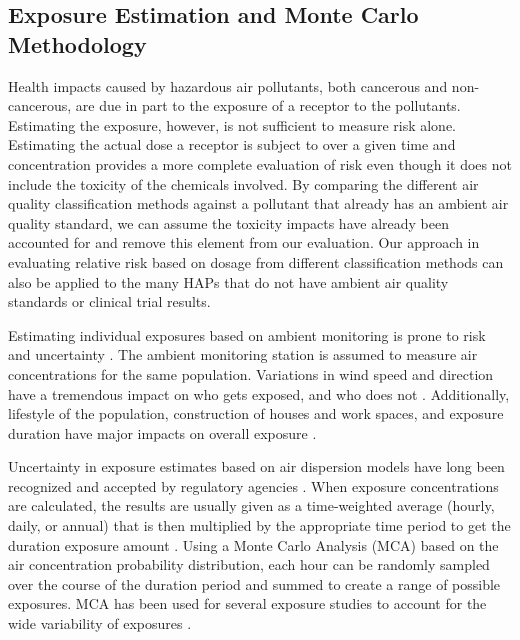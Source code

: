 \subsection{Exposure Estimation and Monte Carlo Methodology}

Health impacts caused by hazardous air pollutants, both cancerous and non-cancerous, are due in part to the exposure of a receptor to the pollutants. Estimating the exposure, however, is not sufficient to measure risk alone. Estimating the actual dose a receptor is subject to over a given time and concentration provides a more complete evaluation of risk even though it does not include the toxicity of the chemicals involved. By comparing the different air quality classification methods against a pollutant that already has an ambient air quality standard, we can assume the toxicity impacts have already been accounted for and remove this element from our evaluation. Our approach in evaluating relative risk based on dosage from different classification methods can also be applied to the many HAPs that do not have ambient air quality standards or clinical trial results.

Estimating individual exposures based on ambient monitoring is prone to risk and uncertainty \citep{Pernigotti2013, Thunis2013}.  The ambient monitoring station is assumed to measure air concentrations for the same population.  Variations in wind speed and direction have a tremendous impact on who gets exposed, and who does not \citep{Pratt2012}. Additionally, lifestyle of the population, construction of houses and work spaces, and exposure duration have major impacts on overall exposure \citep{Bell2006}.

Uncertainty in exposure estimates based on air dispersion models have long been recognized and accepted by regulatory agencies \citep{Colvile2002, Fox1984}.  When exposure concentrations are calculated, the results are usually given as a time-weighted average (hourly, daily, or annual) that is then multiplied by the appropriate time period to get the duration exposure amount \citep{Zhang2013}. Using a Monte Carlo Analysis (MCA) based on the air concentration probability distribution, each hour can be randomly sampled over the course of the duration period and summed to create a range of possible exposures.  MCA has been used for several exposure studies to account for the wide variability of exposures \citep{Gerharz2013, Tan2014}.

